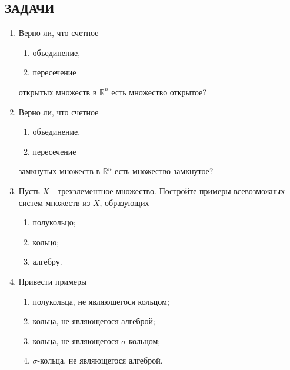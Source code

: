 \documentclass[12pt,a4paper]{article}
\begin{document}
\subsection*{ЗАДАЧИ}
\begin{enumerate}
  \item Верно ли, что счетное
  \begin{enumerate}[label=\alph*)]
    \item объединение,
    \item пересечение
  \end{enumerate}
  открытых множеств в $\mathbb{R}^{n}$ есть множество открытое?

\item Верно ли, что счетное
\begin{enumerate}[label=\alph*)]
  \item объединение,
  \item пересечение
\end{enumerate}
замкнутых множеств в $\mathbb{R}^{n}$ есть множество замкнутое?

\item Пусть $X$ - трехэлементное множество. Постройте примеры всевозможных систем множеств из $X$, образующих
\begin{enumerate}[label=\alph*)]
\item полукольцо;
\item кольцо;
\item алгебру.
\end{enumerate}

\item Привести примеры
\begin{enumerate}[label=\alph*)]
\item полукольца, не являющегося кольцом;
\item кольца, не являющегося алгеброй;
\item кольца, не являющегося $\sigma$-кольцом;
\item $\sigma$-кольца, не являющегося алгеброй.
\end{enumerate}


\end{enumerate}
\end{document}
